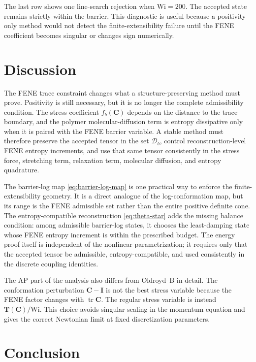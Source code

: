 ﻿\documentclass[11pt]{amsart}
\newcommand{\CC}{\bm C}
\newcommand{\Id}{\bm I}
\newcommand{\TT}{\bm T}
\newcommand{\Wi}{\mathrm{Wi}}
\newcommand{\calD}{\mathcal D}
\newcommand{\tr}{\operatorname{tr}}
\begin{document}
The last row shows one line-search rejection when $\Wi=200$.  The accepted state remains strictly within the barrier.  This diagnostic is useful because a positivity-only method would not detect the finite-extensibility failure until the FENE coefficient becomes singular or changes sign numerically.

\section{Discussion}

The FENE trace constraint changes what a structure-preserving method must prove.  Positivity is still necessary, but it is no longer the complete admissibility condition.  The stress coefficient $f_b(\CC)$ depends on the distance to the trace boundary, and the polymer molecular-diffusion term is entropy dissipative only when it is paired with the FENE barrier variable.  A stable method must therefore preserve the accepted tensor in the set $\calD_b$, control reconstruction-level FENE entropy increments, and use that same tensor consistently in the stress force, stretching term, relaxation term, molecular diffusion, and entropy quadrature.

The barrier-log map \eqref{eq:barrier-log-map} is one practical way to enforce the finite-extensibility geometry.  It is a direct analogue of the log-conformation map, but its range is the FENE admissible set rather than the entire positive definite cone.  The entropy-compatible reconstruction \eqref{eq:theta-star} adds the missing balance condition: among admissible barrier-log states, it chooses the least-damping state whose FENE entropy increment is within the prescribed budget.  The energy proof itself is independent of the nonlinear parametrization; it requires only that the accepted tensor be admissible, entropy-compatible, and used consistently in the discrete coupling identities.

The AP part of the analysis also differs from Oldroyd--B in detail.  The conformation perturbation $\CC-\Id$ is not the best stress variable because the FENE factor changes with $\tr\CC$.  The regular stress variable is instead $\TT(\CC)/\Wi$.  This choice avoids singular scaling in the momentum equation and gives the correct Newtonian limit at fixed discretization parameters.

\section{Conclusion}
\end{document}
